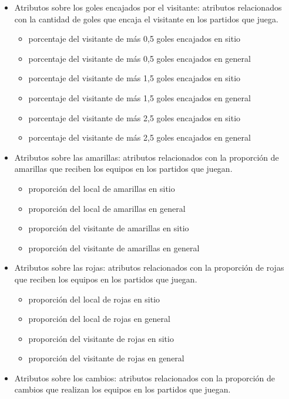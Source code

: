\begin{itemize}
\begin{itemize}
          \end{itemize}
    \item Atributos sobre los goles encajados por el visitante: atributos relacionados con la cantidad de goles que encaja el visitante en los partidos que juega.
          \begin{itemize}
              \item porcentaje del visitante de más 0,5 goles encajados en sitio
              \item porcentaje del visitante de más 0,5 goles encajados en general
              \item porcentaje del visitante de más 1,5 goles encajados en sitio
              \item porcentaje del visitante de más 1,5 goles encajados en general
              \item porcentaje del visitante de más 2,5 goles encajados en sitio
              \item porcentaje del visitante de más 2,5 goles encajados en general
          \end{itemize}
    \item Atributos sobre las amarillas: atributos relacionados con la proporción de amarillas que reciben los equipos en los partidos que juegan.
          \begin{itemize}
              \item proporción del local de amarillas en sitio
              \item proporción del local de amarillas en general
              \item proporción del visitante de amarillas en sitio
              \item proporción del visitante de amarillas en general
          \end{itemize}
    \item Atributos sobre las rojas: atributos relacionados con la proporción de rojas que reciben los equipos en los partidos que juegan.
          \begin{itemize}
              \item proporción del local de rojas en sitio
              \item proporción del local de rojas en general
              \item proporción del visitante de rojas en sitio
              \item proporción del visitante de rojas en general
          \end{itemize}
    \item Atributos sobre los cambios: atributos relacionados con la proporción de cambios que realizan los equipos en los partidos que juegan.

\end{itemize}
